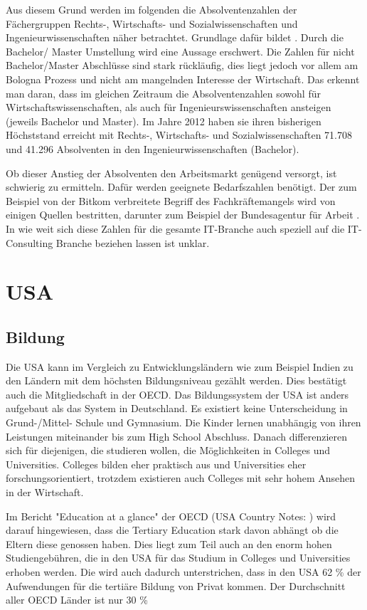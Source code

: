 Aus diesem Grund werden im folgenden die Absolventenzahlen der Fächergruppen Rechts-, Wirtschafts- und Sozialwissenschaften und Ingenieurwissenschaften näher betrachtet.
Grundlage dafür bildet \cite{absolventen} . Durch die Bachelor/ Master Umstellung wird eine Aussage erschwert. Die Zahlen für nicht Bachelor/Master Abschlüsse sind stark rückläufig, dies liegt jedoch vor allem am Bologna Prozess und nicht am mangelnden Interesse der Wirtschaft. Das erkennt man daran, dass im gleichen Zeitraum die Absolventenzahlen sowohl für Wirtschaftswissenschaften, als auch für Ingenieurswissenschaften ansteigen (jeweils Bachelor und Master). Im Jahre 2012 haben sie ihren bisherigen Höchststand erreicht mit Rechts-, Wirtschafts- und Sozialwissenschaften 71.708 und 41.296 Absolventen in den Ingenieurwissenschaften (Bachelor).

Ob dieser Anstieg der Absolventen den Arbeitsmarkt genügend versorgt, ist schwierig zu ermitteln. Dafür werden geeignete Bedarfszahlen benötigt. Der zum Beispiel von der Bitkom verbreitete Begriff \cite{fachkraft} des Fachkräftemangels wird von einigen Quellen bestritten, darunter zum Beispiel der Bundesagentur für Arbeit \cite{fachkraftnein}. In wie weit sich diese Zahlen für die gesamte IT-Branche auch speziell auf die IT-Consulting Branche beziehen lassen ist unklar.

\section{USA}
\subsection{Bildung}
Die USA kann im Vergleich zu Entwicklungsländern wie zum Beispiel Indien zu den Ländern mit dem höchsten Bildungsniveau gezählt werden. Dies bestätigt auch die Mitgliedschaft in der OECD. Das Bildungssystem der USA ist anders aufgebaut als das System in Deutschland. Es existiert keine Unterscheidung in Grund-/Mittel- Schule und Gymnasium. Die Kinder lernen unabhängig von ihren Leistungen miteinander bis zum High School Abschluss. Danach differenzieren sich für diejenigen, die studieren wollen, die Möglichkeiten in Colleges und Universities. Colleges bilden eher praktisch aus und Universities eher forschungsorientiert, trotzdem existieren auch Colleges mit sehr hohem Ansehen in der Wirtschaft. 

Im Bericht "Education at a glance" der OECD (USA Country Notes: \cite{oecd4}) wird darauf hingewiesen, dass die Tertiary Education stark davon abhängt ob die Eltern diese genossen haben. Dies liegt zum Teil auch an den enorm hohen Studiengebühren, die in den USA für das Studium in Colleges und Universities erhoben werden. Die wird auch dadurch unterstrichen, dass in den USA 62 \% der Aufwendungen für die tertiäre Bildung von Privat kommen. Der Durchschnitt aller OECD Länder ist nur 30 \%

